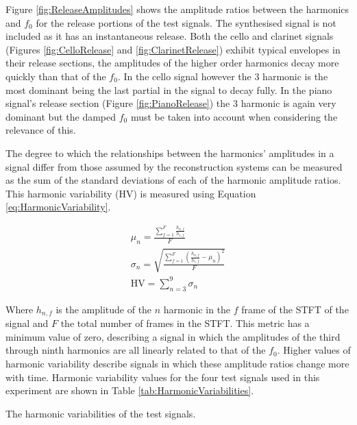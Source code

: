 		Figure \ref{fig:ReleaseAmplitudes} shows the amplitude ratios between the harmonics and $f_{0}$ for the
		release portions of the test signals. The synthesised signal is not included as it has an instantaneous
		release. Both the cello and clarinet signals (Figures \ref{fig:CelloRelease} and \ref{fig:ClarinetRelease})
		exhibit typical envelopes in their release sections, the amplitudes of the higher order harmonics decay
		more quickly than that of the $f_{0}$. In the cello signal however the 3 harmonic is the most
		dominant being the last partial in the signal to decay fully. In the piano signal's release section (Figure
		\ref{fig:PianoRelease}) the 3 harmonic is again very dominant but the damped $f_{0}$ must be
		taken into account when considering the relevance of this.

		The degree to which the relationships between the harmonics' amplitudes in a signal differ from those
		assumed by the reconstruction systems can be measured as the sum of the standard deviations of each of the
		harmonic amplitude ratios. This harmonic variability ($\mathrm{HV}$) is measured using Equation
		\ref{eq:HarmonicVariability}. 		
		
		\begin{gather}
			\mu_{n} = \frac{\sum_{f = 1}^{F} \frac{h_{n,f}}{h_{1,f}}}{F} \nonumber \\
			\sigma_{n} = \sqrt{\frac{\sum_{f = 1}^{F} 
					         \left(\frac{h_{n,f}}{h_{1,f}} - \mu_{n} \right)^{2}}{F}} \nonumber \\
			\mathrm{HV} = \sum_{n = 3}^{9} \sigma_{n}
			\label{eq:HarmonicVariability}
		\end{gather}

		Where $h_{n,f}$ is the amplitude of the $n$ harmonic in the $f$ frame of the STFT of
		the signal and $F$ the total number of frames in the STFT. This metric has a minimum value of zero,
		describing a signal in which the amplitudes of the third through ninth harmonics are all linearly related
		to that of the $f_{0}$. Higher values of harmonic variability describe signals in which these amplitude
		ratios change more with time. Harmonic variability values for the four test signals used in this experiment
		are shown in Table \ref{tab:HarmonicVariabilities}.

		\begin{table}[h!]
			\centering
			
			\caption{The harmonic variabilities of the test signals.}
			\label{tab:HarmonicVariabilities}
		\end{table}


